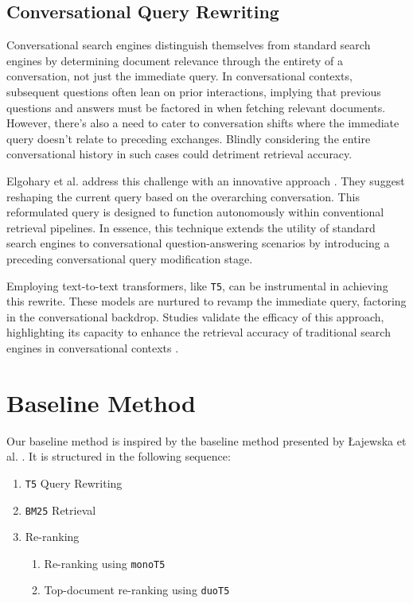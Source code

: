 \documentclass[sigconf]{acmart}
\begin{document}
\subsection*{Conversational Query Rewriting}\label{sec:cqr}

Conversational search engines distinguish themselves from standard search engines by determining document relevance through the entirety of a conversation, not just the immediate query. In conversational contexts, subsequent questions often lean on prior interactions, implying that previous questions and answers must be factored in when fetching relevant documents. However, there's also a need to cater to conversation shifts where the immediate query doesn't relate to preceding exchanges. Blindly considering the entire conversational history in such cases could detriment retrieval accuracy.

Elgohary et al. address this challenge with an innovative approach \cite{elgohary2019can}. They suggest reshaping the current query based on the overarching conversation. This reformulated query is designed to function autonomously within conventional retrieval pipelines. In essence, this technique extends the utility of standard search engines to conversational question-answering scenarios by introducing a preceding conversational query modification stage.

Employing text-to-text transformers, like \texttt{T5}, can be instrumental in achieving this rewrite. These models are nurtured to revamp the immediate query, factoring in the conversational backdrop. Studies validate the efficacy of this approach, highlighting its capacity to enhance the retrieval accuracy of traditional search engines in conversational contexts \cite{elgohary2019can,anantha2020open,Lajewska:2023:ECIR}.



\section{Baseline Method}\label{sec:baseline}
Our baseline method is inspired by the baseline method presented by Łajewska et al. \cite{Lajewska:2023:ECIR}. It is structured in the following sequence:
\begin{enumerate}
	\item	\texttt{T5} Query Rewriting
	\item	\texttt{BM25} Retrieval
	\item	Re-ranking
			\begin{enumerate}
				\item	Re-ranking using \texttt{monoT5}
				\item	Top-document re-ranking using \texttt{duoT5}
			\end{enumerate}
\end{enumerate}
\end{document}
